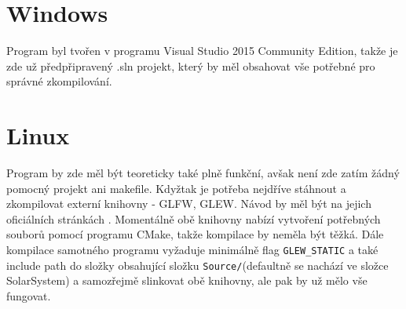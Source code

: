\section{Windows}
Program byl tvořen v programu Visual Studio 2015 Community Edition, takže je zde už předpřipravený .sln projekt, který by měl obsahovat vše potřebné pro správné zkompilování.
\section{Linux}
Program by zde měl být teoreticky také plně funkční, avšak není zde zatím žádný pomocný projekt ani makefile. Kdyžtak je potřeba nejdříve stáhnout a zkompilovat externí knihovny - GLFW, GLEW. Návod by měl být na jejich oficiálních stránkách . Momentálně obě knihovny nabízí vytvoření potřebných souborů pomocí programu CMake, takže kompilace by neměla být těžká. Dále kompilace samotného programu vyžaduje minimálně flag \texttt{GLEW\_STATIC} a také include path do složky obsahující složku \texttt{Source/}(defaultně se nachází ve složce SolarSystem) a samozřejmě slinkovat obě knihovny, ale pak by už mělo vše fungovat. 